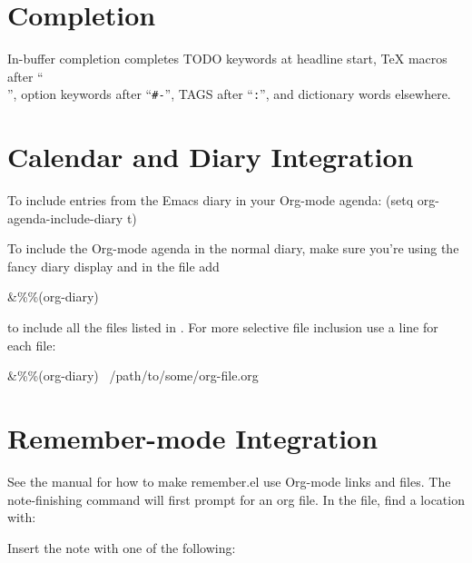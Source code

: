
\section{Completion}

In-buffer completion completes TODO keywords at headline start, TeX
macros after ``{\tt \\}'', option keywords after ``{\tt \#-}'', TAGS
after  ``{\tt :}'', and dictionary words elsewhere.


\newcolumn

\section{Calendar and Diary Integration}

To include entries from the Emacs diary in your Org-mode agenda:
\beginexample%
(setq org-agenda-include-diary t)
\endexample

To include the Org-mode agenda in the normal diary, make sure you're
using the fancy diary display
%
%
and in the  file add

\beginexample%
\&\%\%(org-diary)
\endexample

to include all the files listed in .  For more
selective file inclusion use a line for each file:

\beginexample%
\&\%\%(org-diary) ~/path/to/some/org-file.org
\endexample

\section{Remember-mode Integration}

See the manual for how to make remember.el use Org-mode links and
files.  The note-finishing command  will first prompt for
an org file. In the file, find a location with:


Insert the note with one of the following: 


